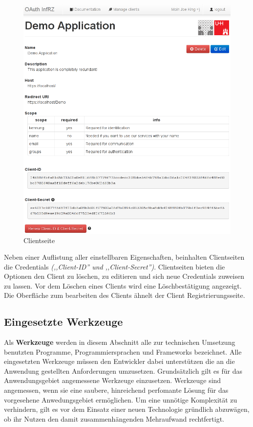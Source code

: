 \documentclass[12pt,a4paper,pointednumbers,abstracton]{scrartcl}
\begin{document}
\begin{figure}[h!]
\centering
\includegraphics[width=15cm]{img/oauth_infrz/client}
\caption{Clientseite}
\label{pic:oauth_infrz/client}
\end{figure}

Neben einer Auflistung aller einstellbaren Eigenschaften, beinhalten Clientseiten die Credentials \emph{(,,Client-ID'' und ,,Client-Secret'')}.
Clientseiten bieten die Optionen den Client zu löschen, zu editieren und sich neue Credentials zuweisen zu lassen.
Vor dem Löschen eines Clients wird eine Löschbestätigung angezeigt.
Die Oberfläche zum bearbeiten des Clients ähnelt der Client Registrierungsseite.

\subsection{Eingesetzte Werkzeuge}
\label{sec:oauth-infrz/used-tools}

Als \textbf{Werkzeuge} werden in diesem Abschnitt alle zur technischen Umsetzung benutzten Programme, Programmiersprachen und Frameworks bezeichnet.
Alle eingesetzten Werkzeuge müssen den Entwickler dabei unterstützen die an die Anwendung gestellten Anforderungen umzusetzen.
Grundsätzlich gilt es für das Anwendungsgebiet angemessene Werkzeuge einzusetzen.
Werkzeuge sind angemessen, wenn sie eine saubere, hinreichend perfomante Lösung für das vorgesehene Anwedungsgebiet ermöglichen.
Um eine unnötige Komplexität zu verhindern, gilt es vor dem Einsatz einer neuen Technologie gründlich abzuwägen, ob ihr Nutzen den damit zusammenhängenden Mehraufwand rechtfertigt.
\end{document}
